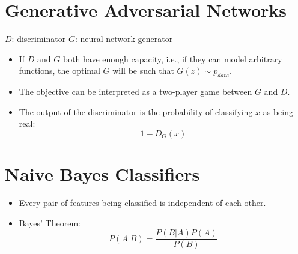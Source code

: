 \documentclass{article}
\begin{document}
\section{Generative Adversarial Networks}
$D$: discriminator
$G$: neural network generator 
\begin{itemize}
    \item If $D$ and $G$ both have enough capacity, i.e., if they can model arbitrary functions, the optimal $G$ will be such that $G(z) \sim p_{data}$.
    \item The objective can be interpreted as a two-player game between $G$ and $D$.
    \item The output of the discriminator is the probability of classifying $x$ as being real:
    \[
    1 - D_G(x)
    \]
\end{itemize}

\section{Naive Bayes Classifiers}
\begin{itemize}
    \item Every pair of features being classified is independent of each other.
    \item Bayes' Theorem:
    \[
    P(A|B) = \frac{P(B|A)P(A)}{P(B)}
    \]
\end{itemize}

\end{document}
